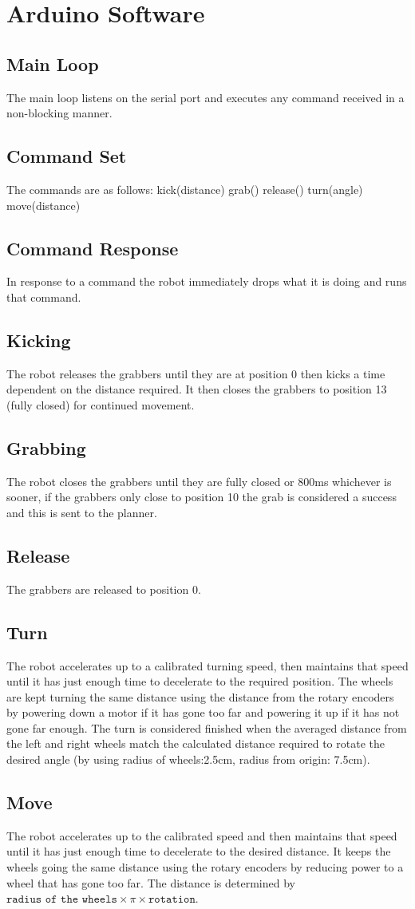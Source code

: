
\section{Arduino Software}
\subsection{Main Loop}
The main loop listens on the serial port and executes any command received in a non-blocking manner. 
\subsection{Command Set}
The commands are as follows:
kick(distance)
grab()
release()
turn(angle)
move(distance)
\subsection{Command Response}
In response to a command the robot immediately drops what it is doing and runs that command. 
\subsection{Kicking}
The robot releases the grabbers until they are at position 0 then kicks a time dependent on the distance required. It then closes the grabbers to position 13 (fully closed) for continued movement.
\subsection{Grabbing}
The robot closes the grabbers until they are fully closed or 800ms whichever is sooner, if the grabbers only close to position 10 the grab is considered a success and this is sent to the planner. 
\subsection{Release}
The grabbers are released to position 0.
\subsection{Turn}
The robot accelerates up to a calibrated turning speed, then maintains that speed until it has just enough time to decelerate to the required position. The wheels are kept turning the same distance using the distance from the rotary encoders by powering down a motor if it has gone too far and powering it up if it has not gone far enough. The turn is considered finished when the averaged distance from the left and right wheels match the calculated distance required to rotate the desired angle (by using radius of wheels:2.5cm, radius from origin: 7.5cm). 
\subsection{Move}
The robot accelerates up to the calibrated speed and then maintains that speed until it has just enough time to decelerate to the desired distance. It keeps the wheels going the same distance using the rotary encoders by reducing power to a wheel that has gone too far. The distance is determined by $\texttt{radius of the wheels} \times \pi \times \texttt{rotation}$. 
